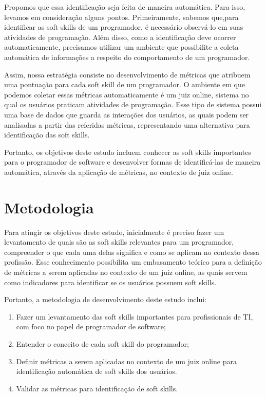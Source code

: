 Propomos que essa identificação seja feita de maneira automática. Para isso, levamos em consideração alguns pontos. Primeiramente, sabemos que,para identificar as soft skills de um programador, é necessário observá-lo em suas atividades de programação. Além disso, como a identificação deve ocorrer automaticamente, precisamos utilizar um ambiente que possibilite a coleta automática de informações a respeito do comportamento de um programador.

Assim, nossa estratégia consiste no desenvolvimento de métricas que atribuem uma pontuação para cada soft skill de um programador. O ambiente em que podemos coletar essas métricas automaticamente é um juiz online, sistema no qual os usuários praticam atividades de programação. Esse tipo de sistema possui uma base de dados que guarda as interações dos usuários, as quais podem ser analisadas a partir das referidas métricas, representando uma alternativa para identificação das soft skills.

Portanto, os objetivos deste estudo incluem conhecer as soft skills importantes para o programador de software e desenvolver formas de identificá-las de maneira automática, através da aplicação de métricas, no contexto de juiz online.

\section{Metodologia}

Para atingir os objetivos deste estudo, inicialmente é preciso fazer um levantamento de quais são as soft skills relevantes para um programador, compreender o que cada uma delas significa e como se aplicam no contexto dessa profissão. Esse conhecimento possibilita um embasamento teórico para a definição de métricas a serem aplicadas no contexto de um juiz online, as quais servem como indicadores para identificar se os usuários possuem soft skills.

Portanto, a metodologia de desenvolvimento deste estudo inclui: 

\begin{enumerate}[label={(\roman*)}]
	\item Fazer um levantamento das soft skills importantes para profissionais de TI, com foco no papel de programador de software;
	\item Entender o conceito de cada soft skill do programador;
	\item Definir métricas a serem aplicadas no contexto de um juiz online para identificação automática de soft skills dos usuários.
	\item Validar as métricas para identificação de soft skills.
\end{enumerate}

